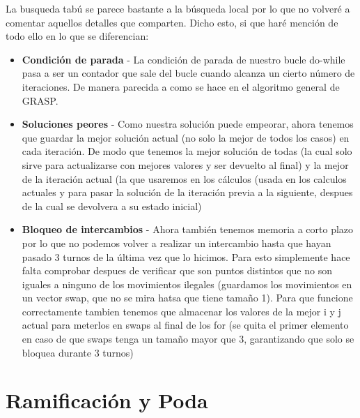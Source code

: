 La busqueda tabú se parece bastante a la búsqueda local por lo que no volveré a comentar aquellos detalles que comparten. Dicho esto, si que haré mención de todo ello en lo que se diferencian: 
\begin{itemize}
  \item \textbf{Condición de parada} - La condición de parada de nuestro bucle do-while pasa a ser un contador que sale del bucle cuando alcanza un cierto número de iteraciones. De manera parecida a como se hace en el algoritmo general de GRASP.
  \item \textbf{Soluciones peores} - Como nuestra solución puede empeorar, ahora tenemos que guardar la mejor solución actual (no solo la mejor de todos los casos) en cada iteración. De modo que tenemos la mejor solución de todas (la cual solo sirve para actualizarse con mejores valores y ser devuelto al final) y la mejor de la iteración actual (la que usaremos en los cálculos (usada en los calculos actuales y para pasar la solución de la iteración previa a la siguiente, despues de la cual se devolvera a su estado inicial)
  \item \textbf{Bloqueo de intercambios} - Ahora también tenemos memoria a corto plazo por lo que no podemos volver a realizar un intercambio hasta que hayan pasado 3 turnos de la última vez que lo hicimos. Para esto simplemente hace falta comprobar despues de verificar que son puntos distintos que no son iguales a ninguno de los movimientos ilegales (guardamos los movimientos en un vector swap, que no se mira hatsa que tiene tamaño 1). Para que funcione correctamente tambien tenemos que almacenar los valores de la mejor i y j actual para meterlos en swaps al final de los for (se quita el primer elemento en caso de que swaps tenga un tamaño mayor que 3, garantizando que solo se bloquea durante 3 turnos)
\end{itemize}

\section{Ramificación y Poda}

